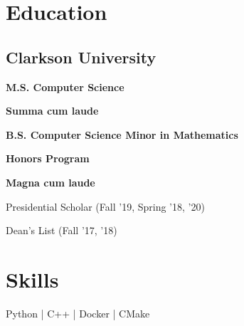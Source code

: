 \documentclass[]{deedy-resume-openfont}
\begin{document}
\begin{minipage}[t]{0.29\textwidth} 


\section{Education}
\subsection{Clarkson University}
\vspace{2mm}

\color{subheadings}\fontsize{12pt}{12pt}\selectfont\bfseries{M.S. Computer Science}

\vspace{3mm}
\begin{tightemize}
\item \textbf{Summa cum laude}
\end{tightemize}
\vspace{2mm}

\color{subheadings}\fontsize{12pt}{12pt}\selectfont\bfseries{B.S. Computer Science} \newline
\color{subheadings}\fontsize{12pt}{12pt}\selectfont\bfseries{Minor in Mathematics} \newline
{}
\begin{tightemize}
\item \textbf{Honors Program}%
\item \textbf{Magna cum laude}
\item Presidential Scholar (Fall '19, Spring '18, '20)
\item Dean's List (Fall '17, '18)

\end{tightemize}
\sectionsep


\section{Skills}
 \newline
Python | C++ | Docker | CMake


\end{minipage}
\end{document}
